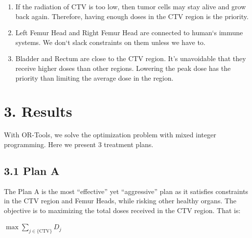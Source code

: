 \documentclass{report}
\begin{document}
\begin{enumerate}
    \item If the radiation of CTV is too low, then tumor cells may stay alive and grow back again. Therefore, having enough doses in the CTV region is the priority.
    \item Left Femur Head and Right Femur Head are connected to human`s immune systems. We don`t slack constraints on them unless we have to.
    \item Bladder and Rectum are close to the CTV region. It's unavoidable that they receive higher doses than other regions. Lowering the peak dose has the priority than limiting the average dose in the region.
\end{enumerate}

\section{3. Results}
With OR-Tools, we solve the optimization problem with mixed integer programming. Here we present 3 treatment plans.

\subsection{3.1 Plan A}
The Plan A is the most ``effective'' yet ``aggressive'' plan as it satisfies constraints in the CTV region and Femur Heads, while risking other healthy organs. The objective is to maximizing the total doses received in the CTV region. That is:\\

\begin{center}
    $\max \sum_{j \in \{\text{CTV}\}} D_j$
\end{center}
\end{document}
